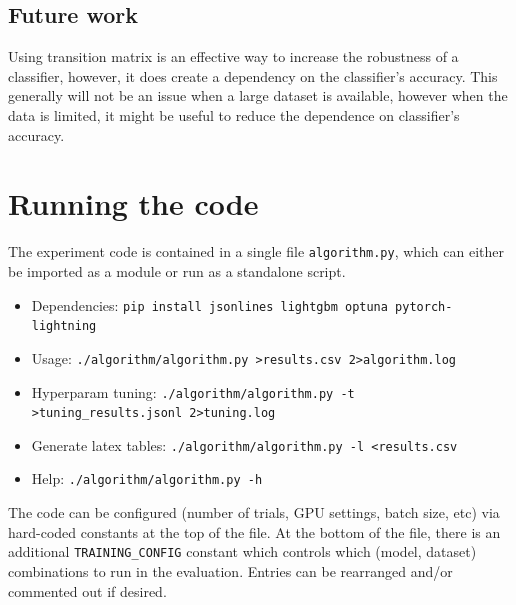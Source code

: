 \documentclass{article} %
\begin{document}
\subsection{Future work}
Using transition matrix is an effective way to increase the robustness of a classifier, however, it does create a dependency on the classifier’s accuracy. This generally will not be an issue when a large dataset is available, however when the data is limited, it might be useful to reduce the dependence on classifier's accuracy.


\pagebreak\printbibliography\appendix

\section{Running the code}
The experiment code is contained in a single file \texttt{algorithm.py}, which can either be imported as a module or run as a standalone script.

\begin{itemize}
\item Dependencies: \texttt{pip install jsonlines lightgbm optuna pytorch-lightning}
\item Usage: \texttt{./algorithm/algorithm.py >results.csv 2>algorithm.log}
\item Hyperparam tuning: \texttt{./algorithm/algorithm.py -t >tuning\_results.jsonl 2>tuning.log}
\item Generate latex tables: \texttt{./algorithm/algorithm.py -l <results.csv}
\item Help: \texttt{./algorithm/algorithm.py -h}
\end{itemize}

The code can be configured (number of trials, GPU settings, batch size, etc) via hard-coded constants at the top of the file. At the bottom of the file, there is an additional \texttt{TRAINING\_CONFIG} constant which controls which (model, dataset) combinations to run in the evaluation. Entries can be rearranged and/or commented out if desired.
\end{document}
